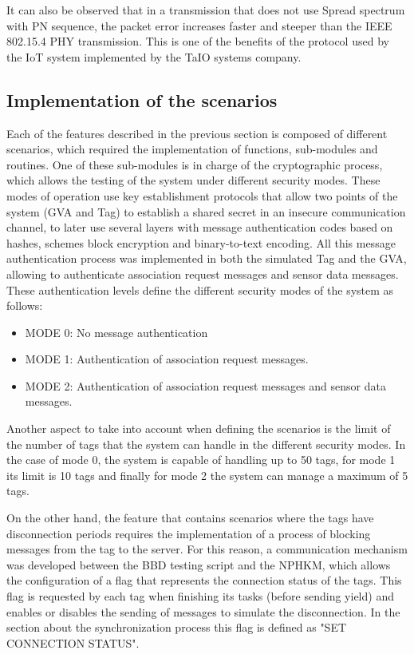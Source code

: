 \documentclass[journal]{IEEEtran}	%
\begin{document}
It can also be observed that in a transmission that does not use Spread spectrum with PN sequence, the packet error increases faster and steeper than the IEEE 802.15.4 PHY transmission. This is one of the benefits of the protocol used by the IoT system implemented by the TaIO systems company.

\subsection{Implementation of the scenarios}
\label{sec:implScenarios}
Each of the features described in the previous section is composed of different scenarios, which required the implementation of functions, sub-modules and routines. One of these sub-modules is in charge of the cryptographic process, which allows the testing of the system under different security modes. These modes of operation use key establishment protocols that allow two points of the system (GVA and Tag) to establish a shared secret in an insecure communication channel, to later use several layers with message authentication codes based on hashes, schemes block encryption and binary-to-text encoding. All this message authentication process was implemented in both the simulated Tag and the GVA, allowing to authenticate association request messages and sensor data messages. These authentication levels define the different security modes of the system as follows:

\begin{itemize}
    \item MODE 0: No message authentication
    \item MODE 1: Authentication of association request messages.
    \item MODE 2: Authentication of association request messages and sensor data messages.
\end{itemize}

Another aspect to take into account when defining the scenarios is the limit of the number of tags that the system can handle in the different security modes. In the case of mode 0, the system is capable of handling up to 50 tags, for mode 1 its limit is 10 tags and finally for mode 2 the system can manage a maximum of 5 tags.

On the other hand, the feature that contains scenarios where the tags have disconnection periods requires the implementation of a process of blocking messages from the tag to the server. For this reason, a communication mechanism was developed between the BBD testing script and the NPHKM, which allows the configuration of a flag that represents the connection status of the tags. This flag is requested by each tag when finishing its tasks (before sending yield) and enables or disables the sending of messages to simulate the disconnection. In the section about the synchronization process this flag is defined as "SET CONNECTION STATUS".
\end{document}
